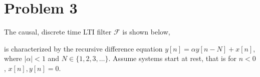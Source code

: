\documentclass[10pt]{article}
\begin{document}
	\section*{Problem 3}
	The causal, discrete time LTI filter \( \mathcal F \) is shown below,
	\begin{center}
	\end{center}
	is characterized by the recursive difference equation \( y[n] = \alpha y[n - N] + x[n] \), where 
	\( |\alpha| < 1 \) and \( N \in \{1, 2, 3, \dots\}  \). Assume systems start at rest, that is for \( n < 0 \), 
	\( x[n], y[n] = 0 \). 
\end{document}
